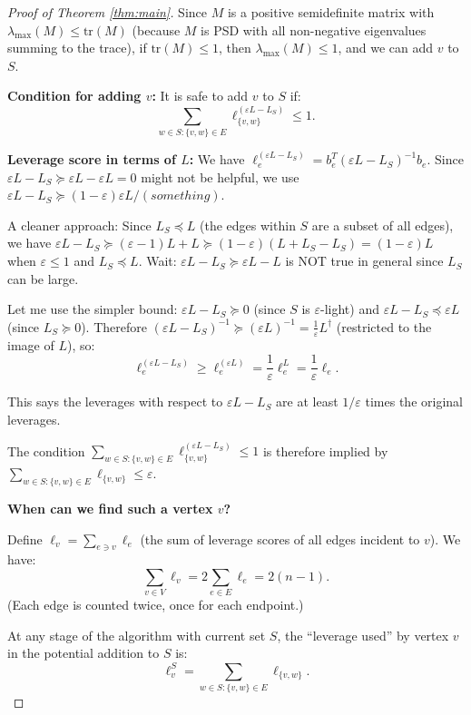 \documentclass[12pt]{article}
\begin{document}
\begin{proof}[Proof of Theorem \ref{thm:main}]
Since $M$ is a positive semidefinite matrix with $\lambda_{\max}(M) \leq \mathrm{tr}(M)$ (because $M$ is PSD with all non-negative eigenvalues summing to the trace), if $\mathrm{tr}(M) \leq 1$, then $\lambda_{\max}(M) \leq 1$, and we can add $v$ to $S$.

\textbf{Condition for adding $v$:} It is safe to add $v$ to $S$ if:
\[
\sum_{w \in S: \{v,w\} \in E} \ell_{\{v,w\}}^{(\varepsilon L - L_S)} \leq 1.
\]

\textbf{Leverage score in terms of $L$:} We have $\ell_e^{(\varepsilon L - L_S)} = b_e^T (\varepsilon L - L_S)^{-1} b_e$. Since $\varepsilon L - L_S \succeq \varepsilon L - \varepsilon L = 0$ might not be helpful, we use $\varepsilon L - L_S \succeq (1-\varepsilon)\varepsilon L / (something)$.

A cleaner approach: Since $L_S \preceq L$ (the edges within $S$ are a subset of all edges), we have $\varepsilon L - L_S \succeq (\varepsilon - 1)L + L \succeq (1-\varepsilon)(L + L_S - L_S) = (1-\varepsilon)L$ when $\varepsilon \leq 1$ and $L_S \preceq L$. Wait: $\varepsilon L - L_S \succeq \varepsilon L - L$ is NOT true in general since $L_S$ can be large.

Let me use the simpler bound: $\varepsilon L - L_S \succeq 0$ (since $S$ is $\varepsilon$-light) and $\varepsilon L - L_S \preceq \varepsilon L$ (since $L_S \succeq 0$). Therefore $(\varepsilon L - L_S)^{-1} \succeq (\varepsilon L)^{-1} = \frac{1}{\varepsilon} L^\dagger$ (restricted to the image of $L$), so:
\[
\ell_e^{(\varepsilon L - L_S)} \geq \ell_e^{(\varepsilon L)} = \frac{1}{\varepsilon} \ell_e^L = \frac{1}{\varepsilon} \ell_e.
\]

This says the leverages with respect to $\varepsilon L - L_S$ are at least $1/\varepsilon$ times the original leverages.

The condition $\sum_{w \in S: \{v,w\} \in E} \ell_{\{v,w\}}^{(\varepsilon L - L_S)} \leq 1$ is therefore implied by $\sum_{w \in S: \{v,w\} \in E} \ell_{\{v,w\}} \leq \varepsilon$.

\textbf{When can we find such a vertex $v$?}

Define $\ell_v = \sum_{e \ni v} \ell_e$ (the sum of leverage scores of all edges incident to $v$). We have:
\[
\sum_{v \in V} \ell_v = 2\sum_{e \in E} \ell_e = 2(n-1).
\]
(Each edge is counted twice, once for each endpoint.)

At any stage of the algorithm with current set $S$, the ``leverage used'' by vertex $v$ in the potential addition to $S$ is:
\[
\ell_v^S = \sum_{w \in S: \{v,w\} \in E} \ell_{\{v,w\}}.
\]


\end{proof}
\end{document}
